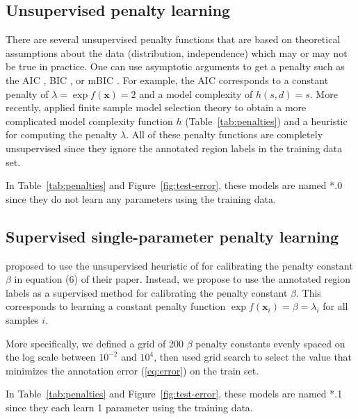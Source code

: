 \documentclass{article}
\begin{document}
\subsection{Unsupervised penalty learning}
\label{sec:unsupervised}


There are several unsupervised penalty functions that are based on theoretical
assumptions about the data (distribution, independence) which may or
may not be true in practice. One can use asymptotic arguments to get a
penalty such as the AIC \citep{Akaike73}, BIC \citep{Schwarz78}, or
mBIC \citep{mBIC}. For example, the AIC corresponds to a constant
penalty of $\lambda=\exp f(\mathbf x)=2$ and a model complexity of
$h(s, d)=s$. More recently, \citet{cleynen2013segmentation} applied
finite sample model selection theory to obtain a more complicated
model complexity function $h$ (Table~\ref{tab:penalties}) and a
heuristic for computing the penalty $\lambda$. All of these penalty
functions are completely unsupervised since they ignore the annotated
region labels in the training data set.

In Table~\ref{tab:penalties} and Figure~\ref{fig:test-error}, these
models are named *.0 since they do not learn any parameters using the
training data.

\subsection{Supervised single-parameter penalty learning}
\label{sec:supervised-single}

\citet{cleynen2013segmentation} proposed to use the un\-supervised
heuristic of \citet{arlot2009data} for calibrating the penalty constant
$\beta$ in equation (6) of their paper. Instead, we propose to use the
annotated region labels as a super\-vised method for calibrating the
penalty constant $\beta$. This corresponds to learning a constant
penalty function $\exp f(\mathbf x_i) = \beta = \lambda_i$ for all
samples $i$.

More specifically, we defined a grid of 200 $\beta$ penalty constants
evenly spaced on the log scale between $10^{-2}$ and $10^4$, then used
grid search to select the value that minimizes the annotation error
(\ref{eq:error}) on the train set.

In Table~\ref{tab:penalties} and Figure~\ref{fig:test-error}, these
models are named *.1 since they each learn 1 parameter using the
training data.
\end{document}
